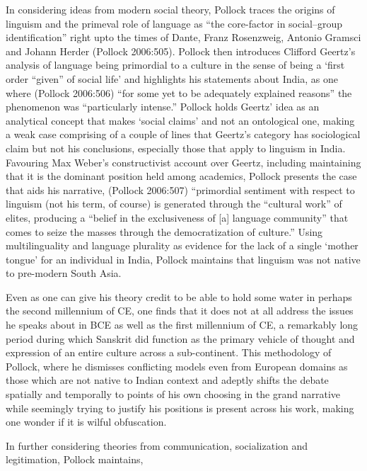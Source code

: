 In considering ideas from modern social theory, Pollock traces the origins of linguism and the primeval role of language as “the core-factor in social–group identification” right upto the times of Dante, Franz Rosenzweig, Antonio Gramsci and Johann Herder (Pollock 2006:505). Pollock then introduces Clifford Geertz’s analysis of language being primordial to a culture in the sense of being a ‘first order “given” of social life’ and highlights his statements about India, as one where (Pollock 2006:506) “for some yet to be adequately explained reasons” the phenomenon was “particularly intense.” Pollock holds Geertz’ idea as an analytical concept that makes ‘social claims’ and not an ontological one, making a weak case comprising of a couple of lines that Geertz’s category has sociological claim but not his conclusions, especially those that apply to linguism in India. Favouring Max Weber’s constructivist account over Geertz, including maintaining that it is the dominant position held among academics, Pollock presents the case that aids his narrative, (Pollock 2006:507) “primordial sentiment with respect to linguism (not his term, of course) is generated through the “cultural work” of elites, producing a “belief in the exclusiveness of [a] language community” that comes to seize the masses through the democratization of culture.” Using multilinguality and language plurality as evidence for the lack of a single ‘mother tongue’ for an individual in India, Pollock maintains that linguism was not native to pre-modern South Asia.

Even as one can give his theory credit to be able to hold some water in perhaps the second millennium of CE, one finds that it does not at all address the issues he speaks about in BCE as well as the first millennium of CE, a remarkably long period during which Sanskrit did function as the primary vehicle of thought and expression of an entire culture across a sub-continent. This methodology of Pollock, where he dismisses conflicting models even from European domains as those which are not native to Indian context and adeptly shifts the debate spatially and temporally to points of his own choosing in the grand narrative while seemingly trying to justify his positions is present across his work, making one wonder if it is wilful obfuscation.

In further considering theories from communication, socialization and legitimation, Pollock maintains,

